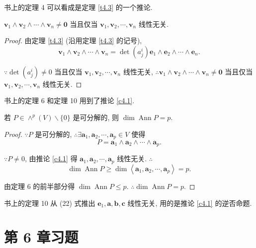 \documentclass[color=black,device=normal,lang=cn,mode=geye]{elegantnote}
\begin{document}
书上的定理 4 可以看成是定理 \ref{t4.3} 的一个推论.
\begin{corollary}[书上的定理 4]\label{c4.1}
    $\boldsymbol{v}_1\wedge\boldsymbol{v}_2\wedge\cdots\wedge\boldsymbol{v}_n\neq\boldsymbol{0}$ 当且仅当 $\boldsymbol{v}_1,\boldsymbol{v}_2,\cdots,\boldsymbol{v}_n$ 线性无关.
\end{corollary}
\begin{proof}
    由定理 \ref{t4.3} (沿用定理 \ref{t4.3} 的记号),
    \[\boldsymbol{v}_1\wedge\boldsymbol{v}_2\wedge\cdots\wedge\boldsymbol{v}_n=\operatorname{det}(a_j^i)\boldsymbol{e}_1\wedge\boldsymbol{e}_2\wedge\cdots\wedge\boldsymbol{e}_n.\]

    $\because\operatorname{det}(a_j^i)\neq0$ 当且仅当 $\boldsymbol{v}_1,\boldsymbol{v}_2,\cdots,\boldsymbol{v}_n$ 线性无关, $\therefore\boldsymbol{v}_1\wedge\boldsymbol{v}_2\wedge\cdots\wedge\boldsymbol{v}_n\neq\boldsymbol{0}$ 当且仅当 $\boldsymbol{v}_1,\boldsymbol{v}_2,\cdots,\boldsymbol{v}_n$ 线性无关.
\end{proof}

书上的定理 6 和定理 10 用到了推论 \ref{c4.1}.
\begin{theorem}
    若 $P\in\wedge^p(V)\backslash\{0\}$ 是可分解的, 则 $\dim\operatorname{Ann}P=p$.
\end{theorem}
\begin{proof}
    $\because P$ 是可分解的, $\therefore\exists\boldsymbol{a}_1,\boldsymbol{a}_2,\cdots,\boldsymbol{a}_p\in V$ 使得
    \[P=\boldsymbol{a}_1\wedge\boldsymbol{a}_2\wedge\cdots\wedge\boldsymbol{a}_p.\]

    $\because P\neq0$, 由推论 \ref{c4.1} 得 $\boldsymbol{a}_1,\boldsymbol{a}_2,\cdots,\boldsymbol{a}_p$ 线性无关. $\therefore$
    \[\dim\operatorname{Ann}P\geq\dim\left<\boldsymbol{a}_1,\boldsymbol{a}_2,\cdots,\boldsymbol{a}_p\right>=p.\]

    由定理 6 的前半部分得 $\dim\operatorname{Ann}P\leq p$. $\therefore\dim\operatorname{Ann}P=p$.
\end{proof}

书上的定理 10 从 (22) 式推出 $\boldsymbol{e}_1,\boldsymbol{a},\boldsymbol{b},\boldsymbol{c}$ 线性无关, 用的是推论 \ref{c4.1} 的逆否命题.
\section{第 6 章习题}
\end{document}
